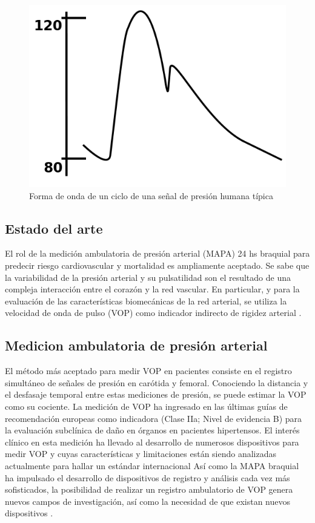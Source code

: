 \begin{figure}[!htbp]
	\centering
	\includegraphics[width=\textwidth]{./Figures/periodopresion.png}
	\caption{Forma de onda de un ciclo de una señal de presión humana típica}
	\label{fig:periodopresion}
\end{figure}


\subsection{Estado del arte}

El rol de la medición ambulatoria de presión arterial (MAPA) \citep{hansen2006} \citep{staensen1999} \citep{verdecchia1993} 24 hs braquial para predecir riesgo cardiovascular y mortalidad es ampliamente aceptado. Se sabe que la variabilidad de la presión arterial y su pulsatilidad son el resultado de una compleja interacción entre el corazón y la red vascular. En particular, y para la evaluación de las características biomecánicas de la red arterial, se utiliza la velocidad de onda de pulso (VOP) como indicador indirecto de rigidez arterial \citep{nichols2008}.

\subsection{Medicion ambulatoria de presión arterial}

El método más aceptado para medir VOP en pacientes consiste en el registro simultáneo de señales de presión en carótida y femoral. Conociendo la distancia y el desfasaje temporal entre estas mediciones de presión, se puede estimar la VOP como su cociente. La medición de VOP ha ingresado en las últimas guías de recomendación europeas como indicadora (Clase IIa; Nivel de evidencia B) para la evaluación subclínica de daño en órganos en pacientes hipertensos. El interés clínico en esta medición ha llevado al desarrollo de numerosos dispositivos para medir VOP y cuyas características y limitaciones están siendo analizadas actualmente para hallar un estándar internacional \citep{laurent2006} Así como la MAPA braquial ha impulsado el desarrollo de dispositivos de registro y análisis cada vez más sofisticados, la posibilidad de realizar un registro ambulatorio de VOP genera nuevos campos de investigación, así como la necesidad de que existan nuevos dispositivos \citep{omboni2016}.



